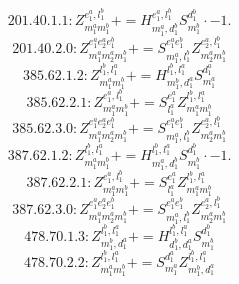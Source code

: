 \documentclass[letterpaper,10pt,fleqn,leqno,onecolumn]{article}
\begin{document}
\begin{equation} \;\;\;\;\;\;  201.40.1.1: Z^{e_{1}^{a},l_{1}^{b}}_{m_{1}^{a}m_{1}^{b}}+=H^{e_{1}^{a},l_{1}^{b}}_{m_{1}^{a},d_{1}^{b}}S^{d_{1}^{b}}_{m_{1}^{b}}\cdot -1. \end{equation}
\begin{equation} \;\;\;\;\;\;  201.40.2.0: Z^{e_{1}^{a}e_{2}^{a}e_{1}^{b}}_{m_{1}^{a}m_{2}^{a}m_{1}^{b}}+=S^{e_{1}^{a}e_{1}^{b}}_{m_{1}^{a},l_{1}^{b}}Z^{e_{2}^{a},l_{1}^{b}}_{m_{2}^{a}m_{1}^{b}} \end{equation}
\begin{equation} \;\;\;\;\;\;  385.62.1.2: Z^{l_{1}^{b},l_{1}^{a}}_{m_{1}^{a}m_{1}^{b}}+=H^{l_{1}^{b},l_{1}^{a}}_{m_{1}^{b},d_{1}^{a}}S^{d_{1}^{a}}_{m_{1}^{a}} \end{equation}
\begin{equation} \;\;\;\;\;\;  385.62.2.1: Z^{e_{1}^{a},l_{1}^{b}}_{m_{1}^{a}m_{1}^{b}}+=S^{e_{1}^{a}}_{l_{1}^{a}}Z^{l_{1}^{b},l_{1}^{a}}_{m_{1}^{a}m_{1}^{b}} \end{equation}
\begin{equation} \;\;\;\;\;\;  385.62.3.0: Z^{e_{1}^{a}e_{2}^{a}e_{1}^{b}}_{m_{1}^{a}m_{2}^{a}m_{1}^{b}}+=S^{e_{1}^{a}e_{1}^{b}}_{m_{1}^{a},l_{1}^{b}}Z^{e_{2}^{a},l_{1}^{b}}_{m_{2}^{a}m_{1}^{b}} \end{equation}
\begin{equation} \;\;\;\;\;\;  387.62.1.2: Z^{l_{1}^{b},l_{1}^{a}}_{m_{1}^{a}m_{1}^{b}}+=H^{l_{1}^{b},l_{1}^{a}}_{m_{1}^{a},d_{1}^{b}}S^{d_{1}^{b}}_{m_{1}^{b}}\cdot -1. \end{equation}
\begin{equation} \;\;\;\;\;\;  387.62.2.1: Z^{e_{1}^{a},l_{1}^{b}}_{m_{1}^{a}m_{1}^{b}}+=S^{e_{1}^{a}}_{l_{1}^{a}}Z^{l_{1}^{b},l_{1}^{a}}_{m_{1}^{a}m_{1}^{b}} \end{equation}
\begin{equation} \;\;\;\;\;\;  387.62.3.0: Z^{e_{1}^{a}e_{2}^{a}e_{1}^{b}}_{m_{1}^{a}m_{2}^{a}m_{1}^{b}}+=S^{e_{1}^{a}e_{1}^{b}}_{m_{1}^{a},l_{1}^{b}}Z^{e_{2}^{a},l_{1}^{b}}_{m_{2}^{a}m_{1}^{b}} \end{equation}
\begin{equation} \;\;\;\;\;\;  478.70.1.3: Z^{l_{1}^{b},l_{1}^{a}}_{m_{1}^{b},d_{1}^{a}}+=H^{l_{1}^{b},l_{1}^{a}}_{d_{1}^{b},d_{1}^{a}}S^{d_{1}^{b}}_{m_{1}^{b}} \end{equation}
\begin{equation} \;\;\;\;\;\;  478.70.2.2: Z^{l_{1}^{b},l_{1}^{a}}_{m_{1}^{a}m_{1}^{b}}+=S^{d_{1}^{a}}_{m_{1}^{a}}Z^{l_{1}^{b},l_{1}^{a}}_{m_{1}^{b},d_{1}^{a}} \end{equation}
\end{document}
